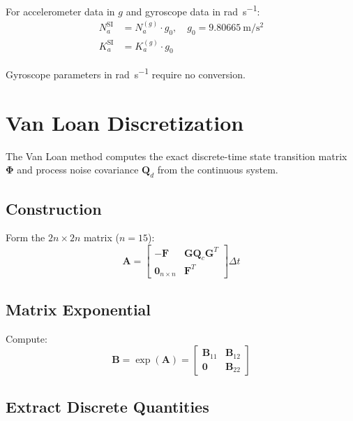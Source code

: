 \documentclass[11pt,a4paper]{article}
\newcommand{\mat}[1]{\mathbf{#1}}
\newcommand{\vect}[1]{\boldsymbol{#1}}
\begin{document}
For accelerometer data in $g$ and gyroscope data in \si{\radian\per\second}:
\begin{align}
    N_a^{\text{SI}} &= N_a^{(g)} \cdot g_0, \quad g_0 = \SI{9.80665}{\meter\per\second\squared} \\
    K_a^{\text{SI}} &= K_a^{(g)} \cdot g_0
\end{align}

Gyroscope parameters in \si{\radian\per\second} require no conversion.

\section{Van Loan Discretization}

The Van Loan method computes the exact discrete-time state transition matrix $\vect{\Phi}$ and process noise covariance $\mat{Q}_d$ from the continuous system.

\subsection{Construction}

Form the $2n \times 2n$ matrix ($n = 15$):
\begin{equation}
    \mat{A} = \begin{bmatrix}
        -\mat{F} & \mat{G}\mat{Q}_c\mat{G}^T \\
        \mat{0}_{n\times n} & \mat{F}^T
    \end{bmatrix} \Delta t
    \label{eq:van_loan_A}
\end{equation}

\subsection{Matrix Exponential}

Compute:
\begin{equation}
    \mat{B} = \exp(\mat{A}) = \begin{bmatrix}
        \mat{B}_{11} & \mat{B}_{12} \\
        \mat{0} & \mat{B}_{22}
    \end{bmatrix}
\end{equation}

\subsection{Extract Discrete Quantities}
\end{document}
